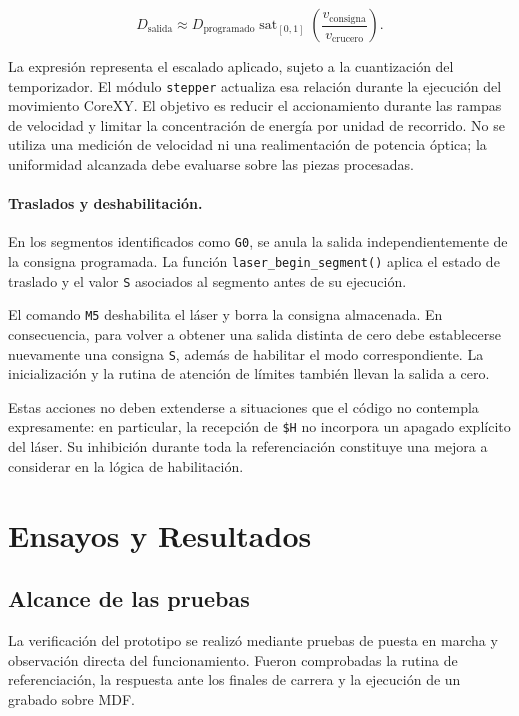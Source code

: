 \documentclass[blue,fullpaper]{ludusofficial}  %
\begin{document}
\begin{equation}
    D_{\mathrm{salida}} \approx D_{\mathrm{programado}}
    \operatorname{sat}_{[0,1]}
    \left(\frac{v_{\mathrm{consigna}}}{v_{\mathrm{crucero}}}\right).
\end{equation}

La expresión representa el escalado aplicado,
sujeto a la cuantización del temporizador.
El módulo \texttt{stepper} actualiza esa relación
durante la ejecución del movimiento CoreXY.
El objetivo es reducir el accionamiento durante
las rampas de velocidad y limitar la concentración
de energía por unidad de recorrido. No se utiliza
una medición de velocidad ni una realimentación
de potencia óptica; la uniformidad alcanzada
debe evaluarse sobre las piezas procesadas.

\paragraph{Traslados y deshabilitación.}
En los segmentos identificados como \texttt{G0},
se anula la salida independientemente de la consigna
programada. La función \texttt{laser\_begin\_segment()}
aplica el estado de traslado y el valor \texttt{S}
asociados al segmento antes de su ejecución.

El comando \texttt{M5} deshabilita el láser y borra
la consigna almacenada. En consecuencia, para volver
a obtener una salida distinta de cero debe establecerse
nuevamente una consigna \texttt{S}, además de habilitar
el modo correspondiente. La inicialización y la rutina
de atención de límites también llevan la salida a cero.

Estas acciones no deben extenderse a situaciones
que el código no contempla expresamente: en particular,
la recepción de \texttt{\$H} no incorpora un apagado
explícito del láser. Su inhibición durante toda la
referenciación constituye una mejora a considerar
en la lógica de habilitación.

\section{Ensayos y Resultados}
\label{sec:ensayos}

\subsection{Alcance de las pruebas}

La verificación del prototipo se realizó mediante
pruebas de puesta en marcha y observación directa
del funcionamiento. Fueron comprobadas la rutina
de referenciación, la respuesta ante los finales
de carrera y la ejecución de un grabado sobre MDF.
\end{document}
